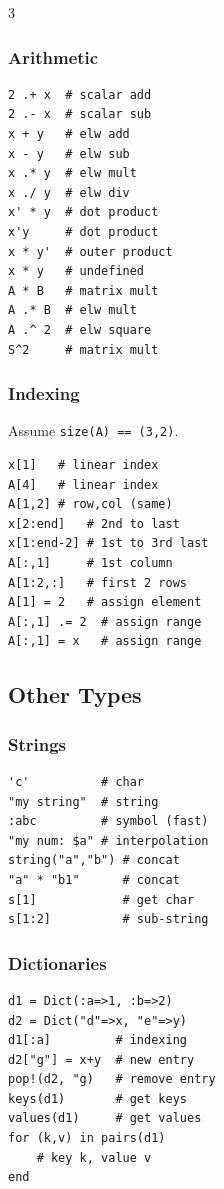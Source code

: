 \begin{multicols*}{3}
\subsubsection{Arithmetic}
\vspace*{-2mm}
\begin{verbatim}
2 .+ x  # scalar add
2 .- x  # scalar sub 
x + y   # elw add
x - y   # elw sub
x .* y  # elw mult
x ./ y  # elw div 
x' * y  # dot product
x'y     # dot product
x * y'  # outer product
x * y   # undefined
A * B   # matrix mult
A .* B  # elw mult
A .^ 2  # elw square
S^2     # matrix mult 
\end{verbatim}

\subsubsection{Indexing}
\vspace*{-2mm}
Assume \texttt{size(A) == (3,2)}.
\vspace*{-2mm}
\begin{verbatim}
x[1]   # linear index
A[4]   # linear index
A[1,2] # row,col (same)
x[2:end]   # 2nd to last
x[1:end-2] # 1st to 3rd last
A[:,1]     # 1st column
A[1:2,:]   # first 2 rows
A[1] = 2   # assign element
A[:,1] .= 2  # assign range
A[:,1] = x   # assign range
\end{verbatim}

\subsection{Other Types}
\subsubsection{Strings}
\vspace*{-2mm}
\begin{verbatim}
'c'          # char
"my string"  # string
:abc         # symbol (fast)
"my num: $a" # interpolation
string("a","b") # concat
"a" * "b1"      # concat
s[1]            # get char
s[1:2]          # sub-string
\end{verbatim}

\subsubsection{Dictionaries}
\vspace{-2mm}
\begin{verbatim} 
d1 = Dict(:a=>1, :b=>2)
d2 = Dict("d"=>x, "e"=>y)
d1[:a]         # indexing
d2["g"] = x+y  # new entry 
pop!(d2, "g)   # remove entry
keys(d1)       # get keys
values(d1)     # get values
for (k,v) in pairs(d1) 
    # key k, value v 
end
\end{verbatim}


\end{multicols*}

